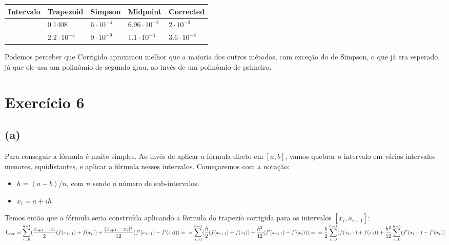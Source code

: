 \documentclass[11pt]{article}
\begin{document}
\begin{center}
\begin{tabular}{lllll}
\hline
Intervalo & Trapezoid & Simpson & Midpoint & Corrected\\
\hline
\hline
[0, 1] & 0.1408 & \(6\cdot 10^{-4}\) & \(6.96\cdot 10^{-2}\) & \(2\cdot 10^{-3}\)\\
\hline
[0.9, 1] & \(2.2\cdot 10^{-4}\) & \(9\cdot 10^{-9}\) & \(1.1\cdot 10^{-4}\) & \(3.6\cdot 10^{-8}\)\\
\hline
\hline
\end{tabular}
\end{center}

Podemos perceber que Corrigido aproximou melhor que a maioria dos outros métodos, com exceção do de Simpson,
o que já era esperado, já que ele usa um polinômio de segundo grau, ao invés de um polinômio de primeiro.

\newpage

\section{Exercício 6}
\label{sec:orgca210c3}
\subsection{(a)}
\label{sec:org5d2172b}
Para conseguir a fórmula é muito simples. Ao invés de aplicar a fórmula direto
em \([a, b]\), vamos quebrar o intervalo em vários intervalos menores, equidistantes,
e aplicar a fórmula nesses intervalos.
Começaremos com a notação:

\begin{itemize}
\item \(h = (a-b)/n\), com \(n\) sendo o número de sub-intervalos.
\item \(x_i = a + ih\)
\end{itemize}

Temos então que a fórmula seria construída aplicando a fórmula do trapezío corrigida
para os intervalos \([x_{i}, x_{i+1}]\): \\

\(\displaystyle I_{cctr} = \sum_{i=0}^{n-1}(\frac{x_{i+1}-x_i}{2}(f(x_{i+1})+f(x_i))+\frac{(x_{i+1}-x_i)^2}{12}(f'(x_{i+1})-f'(x_i))) = \\
   = \sum_{i=0}^{n-1}(\frac{h}{2}(f(x_{i+1})+f(x_i))+\frac{h^2}{12}(f'(x_{i+1})-f'(x_i))) = \\
   = \frac{h}{2}\sum_{i=0}^{n-1}(f(x_{i+1})+f(x_i)) + \frac{h^2}{12}\sum_{i=0}^{n-1}(f'(x_{i+1})-f'(x_i))\)
\end{document}
